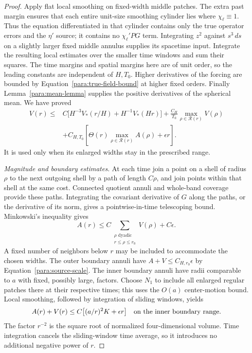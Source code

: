 \begin{proof}
Apply flat local smoothing on fixed-width middle patches.  The extra
past margin ensures that each entire unit-size smoothing cylinder lies
where $\chi_\ell\equiv1$.  Thus the equation differentiated in that
cylinder contains only the true operator errors and the $\eta'$ source;
it contains no $\chi_\ell'PG$ term.  Integrating $z^2$ against $s^3\,ds$ on a slightly
larger fixed middle annulus supplies its spacetime input.  Integrate
the resulting local estimates over the smaller time windows and sum
their squares.  The time margins and spatial margins here are of
unit order, so the leading constants are independent of $H,T_0$.
Higher derivatives of the forcing are bounded by
Equation~\eqref{para:true-field-bound} at higher fixed orders.
Finally Lemma~\ref{para:mean-lemma} supplies the positive derivatives
of the spherical mean.  We have proved
\begin{equation}
 \begin{split}
 V(r)\le{}&C\bigl[H^{-3}V_*(r/H)+H^{-1}V_*(Hr)\bigr]
       +\frac{C_H}{T_0}\max_{\rho\in\mathcal R(r)}V(\rho)\\
       &+C_{H,T_0}\left[\Theta(r)
                     \max_{\rho\in\mathcal R(r)}A(\rho)+\epsilon r\right].
 \end{split}
 \label{para:exterior-recurrence}
\end{equation}
It is used only when its enlarged widths stay in the prescribed range.

\emph{Magnitude and boundary estimates.}
At each time join a point on a shell of radius $\rho$ to the next
outgoing shell by a path of length $C\rho$, and join points within
that shell at the same cost.  Connected quotient annuli and whole-band
coverage provide these paths.  Integrating the covariant derivative
of $G$ along the paths, or the derivative of its norm, gives a
pointwise-in-time telescoping bound.  Minkowski's inequality gives
\begin{equation}
 A(r)\le C\sum_{\substack{\rho\text{ dyadic}\\r\le\rho\le r_0}}
                 V(\rho)+C\epsilon.
 \label{para:magnitude-sum}
\end{equation}
A fixed number of neighbors below $r$ may be included to accommodate
the chosen widths.  The outer boundary annuli have $A+V\le
C_{H,r_0}\epsilon$ by Equation~\eqref{para:source-scale}.
The inner boundary annuli have radii comparable to $a$ with fixed,
possibly large, factors.  Choose $N_1$ to include all enlarged
regular patches there at their respective times; this uses the
$O(a)$ center-motion bound.  Local smoothing, followed by integration
of sliding windows, yields
\begin{equation}
 A(r)+V(r)\le C\bigl[(a/r)^2K+\epsilon r\bigr]
 \quad\hbox{on the inner boundary range}.
 \label{para:inner-boundary}
\end{equation}
The factor $r^{-2}$ is the square root of normalized four-dimensional
volume.  Time integration cancels the sliding-window time average,
so it introduces no additional negative power of $r$.


\end{proof}
